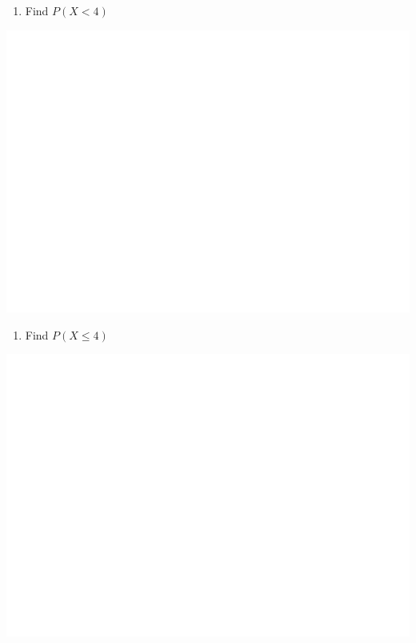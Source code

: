 \documentclass[]{book}
\providecommand{\tightlist}{%
  \setlength{\itemsep}{0pt}\setlength{\parskip}{0pt}}
\begin{document}
\begin{enumerate}
\def\labelenumi{\arabic{enumi}.}
\setcounter{enumi}{1}
\tightlist
\item
  Find \(P(X<4)\)
\end{enumerate}

\begin{center}\includegraphics[width=1\linewidth]{figure/Ch1box9-1} \end{center}

\begin{enumerate}
\def\labelenumi{\arabic{enumi}.}
\setcounter{enumi}{2}
\tightlist
\item
  Find \(P(X\leq4)\)
\end{enumerate}

\begin{center}\includegraphics[width=1\linewidth]{figure/Ch1box10-1} \end{center}
\end{document}
